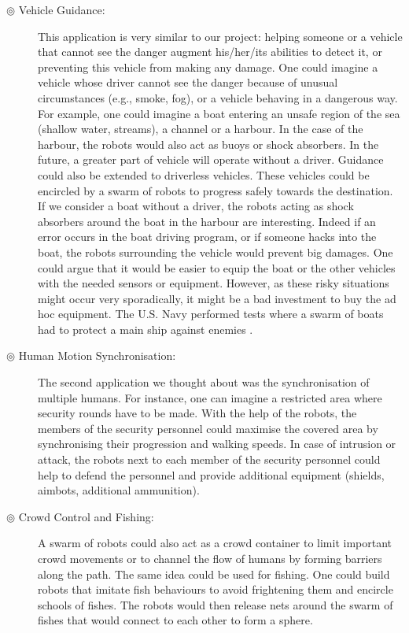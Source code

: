 \documentclass[oneside, a4paper, 12pt]{memoir}
\begin{document}
			\begin{description}
				\item[$\circledcirc$ Vehicle Guidance:] This application is very similar to our project: helping someone or a vehicle that cannot see the danger augment his/her/its abilities to detect it, or preventing this vehicle from making any damage. One could imagine a vehicle whose driver cannot see the danger because of unusual circumstances (e.g., smoke, fog), or a vehicle behaving in a dangerous way. For example, one could imagine a boat entering an unsafe region of the sea (shallow water, streams), a channel or a harbour. In the case of the harbour, the robots would also act as buoys or shock absorbers. In the future, a greater part of vehicle will operate without a driver. Guidance could also be extended to driverless vehicles. These vehicles could be encircled by a swarm of robots to progress safely towards the destination. If we consider a boat without a driver, the robots acting as shock absorbers around the boat in the harbour are interesting. Indeed if an error occurs in the boat driving program, or if someone hacks into the boat, the robots surrounding the vehicle would prevent big damages. One could argue that it would be easier to equip the boat or the other vehicles with the needed sensors or equipment. However, as these risky situations might occur very sporadically, it might be a bad investment to buy the ad hoc equipment. The U.S. Navy performed tests where a swarm of boats had to protect a main ship against enemies \citep{USNavy2014}.
				
				\item[$\circledcirc$ Human Motion Synchronisation:] The second application we thought about was the synchronisation of multiple humans. For instance, one can imagine a restricted area where security rounds have to be made. With the help of the robots, the members of the security personnel could maximise the covered area by synchronising their progression and walking speeds. In case of intrusion or attack, the robots next to each member of the security personnel could help to defend the personnel and provide additional equipment (shields, aimbots, additional ammunition).
				
				\item[$\circledcirc$ Crowd Control and Fishing:] A swarm of robots could also act as a crowd container to limit important crowd movements or to channel the flow of humans by forming barriers along the path. The same idea could be used for fishing. One could build robots that imitate fish behaviours to avoid frightening them and encircle schools of fishes. The robots would then release nets around the swarm of fishes that would connect to each other to form a sphere.
			\end{description}
			
\end{document}
